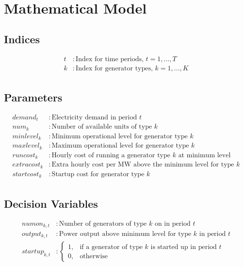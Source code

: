\documentclass{article}
\begin{document}
\section*{Mathematical Model}

\subsection*{Indices}
\begin{align*}
t & : \text{Index for time periods, } t = 1, \ldots, T \\
k & : \text{Index for generator types, } k = 1, \ldots, K \\
\end{align*}

\subsection*{Parameters}
\begin{align*}
demand_t & : \text{Electricity demand in period } t \\
num_k & : \text{Number of available units of type } k \\
minlevel_k & : \text{Minimum operational level for generator type } k \\
maxlevel_k & : \text{Maximum operational level for generator type } k \\
runcost_k & : \text{Hourly cost of running a generator type } k \text{ at minimum level} \\
extracost_k & : \text{Extra hourly cost per MW above the minimum level for type } k \\
startcost_k & : \text{Startup cost for generator type } k \\
\end{align*}

\subsection*{Decision Variables}
\begin{align*}
numon_{k,t} & : \text{Number of generators of type } k \text{ on in period } t \\
output_{k,t} & : \text{Power output above minimum level for type } k \text{ in period } t \\
startup_{k,t} & : \begin{cases} 
1, & \text{if a generator of type } k \text{ is started up in period } t \\
0, & \text{otherwise} 
\end{cases} \\
\end{align*}
\end{document}
